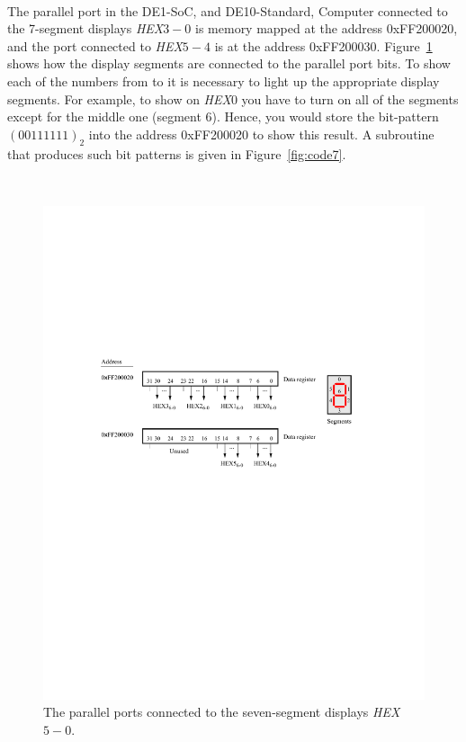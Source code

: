 \documentclass[epsfig,10pt,fullpage]{article}
\begin{document}
~\\
\noindent
The parallel port in the DE1-SoC, and DE10-Standard, Computer connected to the 7-segment displays 
{\it HEX}$3-0$ is memory mapped at the address {\sf 0xFF200020}, 
and the port connected to {\it HEX}$5-4$ is at the address {\sf 0xFF200030}. 
Figure~\ref{fig:HEX} shows how the display segments are connected to the parallel port bits.  
To show each of the numbers from  to  it is necessary
to light up the appropriate
display segments. For example, to show  on {\it HEX}0 you have to turn on all 
of the segments except for the middle one (segment 6). Hence, you would store the
bit-pattern $(00111111)_2$ into the address {\sf 0xFF200020} to show this result.
A subroutine that produces such bit patterns is given in Figure~\ref{fig:code7}.

~\\
\begin{figure}[htb]
	\begin{center}
	\includegraphics[scale=1]{figures/figureHEX.pdf}
	\end{center}
	\caption{The parallel ports connected to the seven-segment displays {\it HEX}$5-0$.}
\label{fig:HEX}
\end{figure}
\end{document}
